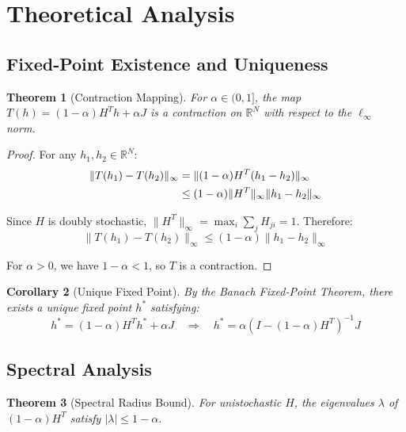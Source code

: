 \documentclass[11pt,a4paper]{article}
\newtheorem{theorem}{Theorem}[section]
\newtheorem{corollary}[theorem]{Corollary}
\newcommand{\R}{\mathbb{R}}
\begin{document}
\section{Theoretical Analysis}
\label{sec:theory}

\subsection{Fixed-Point Existence and Uniqueness}

\begin{theorem}[Contraction Mapping]
\label{thm:contraction}
For $\alpha \in (0, 1]$, the map $T(h) = (1-\alpha)H^T h + \alpha J$ is a contraction on $\R^N$ with respect to the $\ell_\infty$ norm.
\end{theorem}

\begin{proof}
For any $h_1, h_2 \in \R^N$:
\begin{align}
\|T(h_1) - T(h_2)\|_\infty &= \|(1-\alpha)H^T(h_1 - h_2)\|_\infty \notag \\
&\leq (1-\alpha)\|H^T\|_\infty \|h_1 - h_2\|_\infty
\end{align}

Since $H$ is doubly stochastic, $\|H^T\|_\infty = \max_i \sum_j H_{ji} = 1$. Therefore:
\begin{equation}
\|T(h_1) - T(h_2)\|_\infty \leq (1-\alpha)\|h_1 - h_2\|_\infty
\end{equation}

For $\alpha > 0$, we have $1 - \alpha < 1$, so $T$ is a contraction.
\end{proof}

\begin{corollary}[Unique Fixed Point]
By the Banach Fixed-Point Theorem, there exists a unique fixed point $h^*$ satisfying:
\begin{equation}
h^* = (1-\alpha)H^T h^* + \alpha J \quad \Rightarrow \quad h^* = \alpha(I - (1-\alpha)H^T)^{-1}J
\end{equation}
\end{corollary}

\subsection{Spectral Analysis}

\begin{theorem}[Spectral Radius Bound]
\label{thm:spectral}
For unistochastic $H$, the eigenvalues $\lambda$ of $(1-\alpha)H^T$ satisfy $|\lambda| \leq 1 - \alpha$.
\end{theorem}
\end{document}
